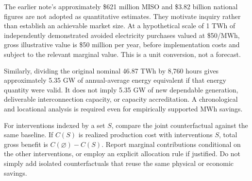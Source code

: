 \documentclass[11pt,letterpaper]{article}
\begin{document}
The earlier note's approximately \$621 million MISO and \$3.82 billion national figures are not adopted as quantitative estimates. They motivate inquiry rather than establish an achievable market size. At a hypothetical scale of 1 TWh of independently demonstrated avoided electricity purchases valued at \$50/MWh, gross illustrative value is \$50 million per year, before implementation costs and subject to the relevant marginal value. This is a unit conversion, not a forecast.

Similarly, dividing the original nominal 46.87 TWh by 8,760 hours gives approximately 5.35 GW of annual-average energy equivalent if that energy quantity were valid. It does not imply 5.35 GW of new dependable generation, deliverable interconnection capacity, or capacity accreditation. A chronological and locational analysis is required even for empirically supported MWh savings.

For interventions indexed by a set $S$, compare the joint counterfactual against the same baseline. If $C(S)$ is realized production cost with interventions $S$, total gross benefit is $C(\varnothing)-C(S)$. Report marginal contributions conditional on the other interventions, or employ an explicit allocation rule if justified. Do not simply add isolated counterfactuals that reuse the same physical or economic savings.
\end{document}
